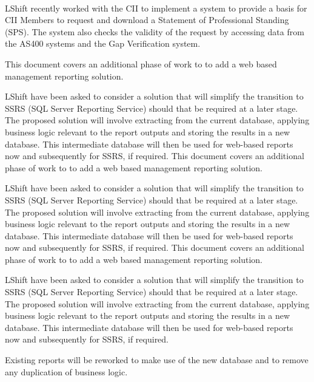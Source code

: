 \documentclass[10pt, a4paper, parskip=half,
               enlargefirstpage ]{scrlttr2}
\begin{document}

\begin{letter}{%
\tystrrecipient \\
\tystrrecipientaddress
}
\opening{\tystropening}
LShift recently worked with the CII to implement a system to provide a basis for CII Members to request and download a Statement of Professional Standing (SPS). The system also checks the validity of the request by accessing data from the AS400 systems and the Gap Verification system.

This document covers an additional phase of work to to add a web based management reporting solution.

LShift have been asked to consider a solution that will simplify the transition to SSRS (SQL Server Reporting Service) should that be required at a later stage. The proposed solution will involve extracting from the current database, applying business logic relevant to the report outputs and storing the results in a new database. This intermediate database will then be used for web-based reports now and subsequently for SSRS, if required. 
This document covers an additional phase of work to to add a web based management reporting solution.

LShift have been asked to consider a solution that will simplify the transition to SSRS (SQL Server Reporting Service) should that be required at a later stage. The proposed solution will involve extracting from the current database, applying business logic relevant to the report outputs and storing the results in a new database. This intermediate database will then be used for web-based reports now and subsequently for SSRS, if required. 
This document covers an additional phase of work to to add a web based management reporting solution.

LShift have been asked to consider a solution that will simplify the transition to SSRS (SQL Server Reporting Service) should that be required at a later stage. The proposed solution will involve extracting from the current database, applying business logic relevant to the report outputs and storing the results in a new database. This intermediate database will then be used for web-based reports now and subsequently for SSRS, if required. 

Existing reports will be reworked to make use of the new database and to remove any duplication of business logic. 


\end{letter}
\end{document}
